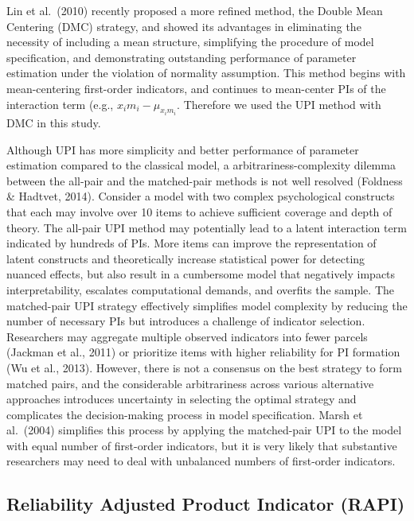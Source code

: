 \documentclass[
  man]{apa7}
\begin{document}
Lin et al.~(2010) recently proposed a more refined method, the Double Mean Centering (DMC) strategy, and showed its advantages in eliminating the necessity of including a mean structure, simplifying the procedure of model specification, and demonstrating outstanding performance of parameter estimation under the violation of normality assumption. This method begins with mean-centering first-order indicators, and continues to mean-center PIs of the interaction term (e.g., \(x_{i}m_{i} - \mu_{x_{i}m_{i}}\). Therefore we used the UPI method with DMC in this study.

Although UPI has more simplicity and better performance of parameter estimation compared to the classical model, a arbitrariness-complexity dilemma between the all-pair and the matched-pair methods is not well resolved (Foldness \& Hadtvet, 2014). Consider a model with two complex psychological constructs that each may involve over 10 items to achieve sufficient coverage and depth of theory. The all-pair UPI method may potentially lead to a latent interaction term indicated by hundreds of PIs. More items can improve the representation of latent constructs and theoretically increase statistical power for detecting nuanced effects, but also result in a cumbersome model that negatively impacts interpretability, escalates computational demands, and overfits the sample. The matched-pair UPI strategy effectively simplifies model complexity by reducing the number of necessary PIs but introduces a challenge of indicator selection. Researchers may aggregate multiple observed indicators into fewer parcels (Jackman et al., 2011) or prioritize items with higher reliability for PI formation (Wu et al., 2013). However, there is not a consensus on the best strategy to form matched pairs, and the considerable arbitrariness across various alternative approaches introduces uncertainty in selecting the optimal strategy and complicates the decision-making process in model specification. Marsh et al.~(2004) simplifies this process by applying the matched-pair UPI to the model with equal number of first-order indicators, but it is very likely that substantive researchers may need to deal with unbalanced numbers of first-order indicators.

\hypertarget{reliability-adjusted-product-indicator-rapi}{%
\subsection{Reliability Adjusted Product Indicator (RAPI)}\label{reliability-adjusted-product-indicator-rapi}}
\end{document}
